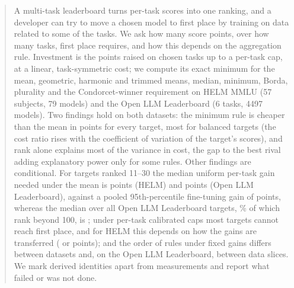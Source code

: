 \begin{abstract}
A multi-task leaderboard turns per-task scores into one ranking, and a developer can try to move a chosen model to first place by training on data related to some of the tasks. We ask how many score points, over how many tasks, first place requires, and how this depends on the aggregation rule. Investment is the points raised on chosen tasks up to a per-task cap, at a linear, task-symmetric cost; we compute its exact minimum for the mean, geometric, harmonic and trimmed means, median, minimum, Borda, plurality and the Condorcet-winner requirement on HELM MMLU (57 subjects, 79 models) and the Open LLM Leaderboard (6 tasks, 4497 models). Two findings hold on both datasets: the minimum rule is cheaper than the mean in points for every target, most for balanced targets (the cost ratio rises with the coefficient of variation of the target's scores), and rank alone explains most of the variance in cost, the gap to the best rival adding explanatory power only for some rules. Other findings are conditional. For targets ranked 11--30 the median uniform per-task gain needed under the mean is \hstarBinHelmMeanElevenThirty{} points (HELM) and \hstarBinOllbMeanElevenThirty{} points (Open LLM Leaderboard), against a pooled 95th-percentile fine-tuning gain of \empPooled{} points, whereas the median over all Open LLM Leaderboard targets, \ollbShareOverHundred\% of which rank beyond 100, is \hstarOllbMean{}; under per-task calibrated caps most targets cannot reach first place, and for HELM this depends on how the gains are transferred (\empMmluQ{} or \empPooled{} points); and the order of rules under fixed gains differs between datasets and, on the Open LLM Leaderboard, between data slices. We mark derived identities apart from measurements and report what failed or was not done.
\end{abstract}
